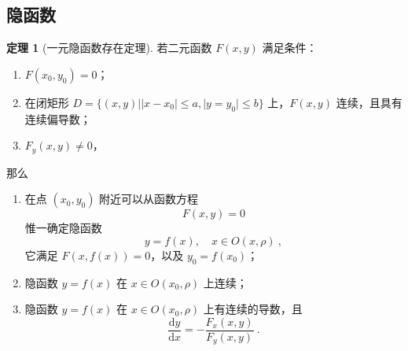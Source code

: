 \documentclass[zihao=-4,linespread=1.8,UTF8,nothm]{aytony_base}
\theoremstyle{definition}
\newtheorem{theorem}{\indent\heiti\textbf{定理}}[subsection]
\begin{document}
\subsection{隐函数}

\begin{theorem}[一元隐函数存在定理]
    若二元函数 $F(x, y)$ 满足条件：

    \begin{enumerate}[nosep]
        \item $F(x_0, y_0) = 0$；
        \item 在闭矩形 $D = \{(x, y)||x - x_0| \leqslant a, |y = y_0| \leqslant b\}$ 上，$F(x, y)$ 连续，且具有连续偏导数；
        \item $F_y(x, y) \neq 0$，
    \end{enumerate}

    那么

    \begin{enumerate}[nosep]
        \item 在点 $(x_0, y_0)$ 附近可以从函数方程 $$
                  F(x, y) = 0
              $$ 惟一确定隐函数 $$
                  y = f(x), \quad x \in O(x, \rho)\ ,
              $$ 它满足 $F(x, f(x)) = 0$，以及 $y_0 = f(x_0)$；
        \item 隐函数 $y = f(x)$ 在 $x \in O(x_0, \rho)$ 上连续；
        \item 隐函数 $y = f(x)$ 在 $x \in O(x_0, \rho)$ 上有连续的导数，且 $$
                  \dfrac{\mathrm{d}y}{\mathrm{d}x} = -\dfrac{F_x(x, y)}{F_y(x, y)}\ .
              $$
    \end{enumerate}
\end{theorem}
\end{document}
